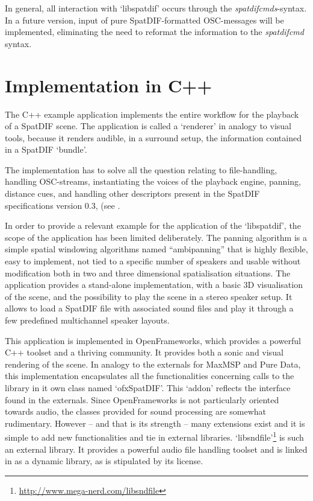 \documentclass{article}
\begin{document}
In general, all interaction with `libspatdif' occurs through the \emph{spatdifcmds}-syntax.
In a future version, input of pure SpatDIF-formatted OSC-messages will be implemented, eliminating the need to reformat the information to the \emph{spatdifcmd} syntax.

\section{Implementation in C++}\label{subsec:code_application}

The C++ example application implements the entire workflow for the playback of a SpatDIF scene. 
The application is called a `renderer' in analogy to visual tools, because it renders audible, in a surround setup, the information contained in a SpatDIF `bundle'.

The implementation has to solve all the question relating to file-handling, handling OSC-streams, instantiating the voices of the playback engine, panning, distance cues, and handling other descriptors present in the SpatDIF specifications version 0.3, (see \cite{SpatDIF_03}.
% 

In order to provide a relevant example for the application of the `libspatdif', the scope of the application has been limited deliberately.
The panning algorithm is a simple spatial windowing algorithms named ``ambipanning'' \cite{Neukom:2008ambipan} that is highly flexible, easy to implement, not tied to a specific number of speakers and usable without modification both in two and three dimensional spatialisation situations.
The application provides a stand-alone implementation, with a basic 3D visualisation of the scene, and the possibility to play the scene in a stereo speaker setup.
It allows to load a SpatDIF file with associated sound files and play it through a few predefined multichannel speaker layouts.

This application is implemented in OpenFrameworks, which provides a powerful C++ toolset and a thriving community.
It provides both a sonic and visual rendering of the scene.
In analogy to the externals for MaxMSP and Pure Data, this implementation encapsulates all the functionalities concerning calls to the library in it own class named `ofxSpatDIF'.
This `addon' reflects the interface found in the externals.
Since OpenFrameworks is not particularly oriented towards audio, the classes provided for sound processing are somewhat rudimentary.
However -- and that is its strength -- many extensions exist and it is simple to add new functionalities and tie in external libraries.
`libsndfile'\footnote{\url{http://www.mega-nerd.com/libsndfile}} is such an external library. 
It provides a powerful audio file handling toolset and is linked in as a dynamic library, as is stipulated by its license.
\end{document}
